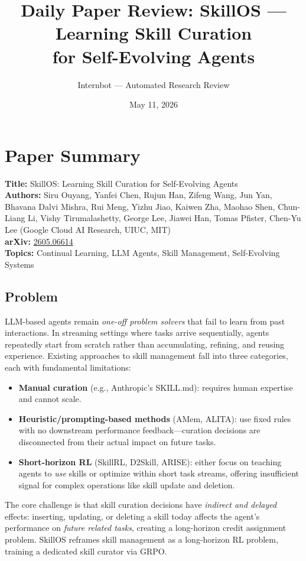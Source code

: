 \documentclass[11pt]{article}
\title{Daily Paper Review: SkillOS --- Learning Skill Curation\\for Self-Evolving Agents}
\author{Internbot --- Automated Research Review}
\date{May 11, 2026}
\begin{document}
\maketitle

\section{Paper Summary}

\textbf{Title:} SkillOS: Learning Skill Curation for Self-Evolving Agents \\
\textbf{Authors:} Siru Ouyang, Yanfei Chen, Rujun Han, Zifeng Wang, Jun Yan, Bhavana Dalvi Mishra, Rui Meng, Yizhu Jiao, Kaiwen Zha, Maohao Shen, Chun-Liang Li, Vishy Tirumalashetty, George Lee, Jiawei Han, Tomas Pfister, Chen-Yu Lee (Google Cloud AI Research, UIUC, MIT) \\
\textbf{arXiv:} \href{https://arxiv.org/abs/2605.06614}{2605.06614} \\
\textbf{Topics:} Continual Learning, LLM Agents, Skill Management, Self-Evolving Systems

\subsection{Problem}

LLM-based agents remain \emph{one-off problem solvers} that fail to learn from past interactions. In streaming settings where tasks arrive sequentially, agents repeatedly start from scratch rather than accumulating, refining, and reusing experience. Existing approaches to skill management fall into three categories, each with fundamental limitations:

\begin{itemize}
    \item \textbf{Manual curation} (e.g., Anthropic's SKILL.md): requires human expertise and cannot scale.
    \item \textbf{Heuristic/prompting-based methods} (AMem, ALITA): use fixed rules with no downstream performance feedback---curation decisions are disconnected from their actual impact on future tasks.
    \item \textbf{Short-horizon RL} (SkillRL, D2Skill, ARISE): either focus on teaching agents to \emph{use} skills or optimize within short task streams, offering insufficient signal for complex operations like skill update and deletion.
\end{itemize}

The core challenge is that skill curation decisions have \emph{indirect and delayed} effects: inserting, updating, or deleting a skill today affects the agent's performance on \emph{future related tasks}, creating a long-horizon credit assignment problem. SkillOS reframes skill management as a long-horizon RL problem, training a dedicated skill curator via GRPO.
\end{document}
